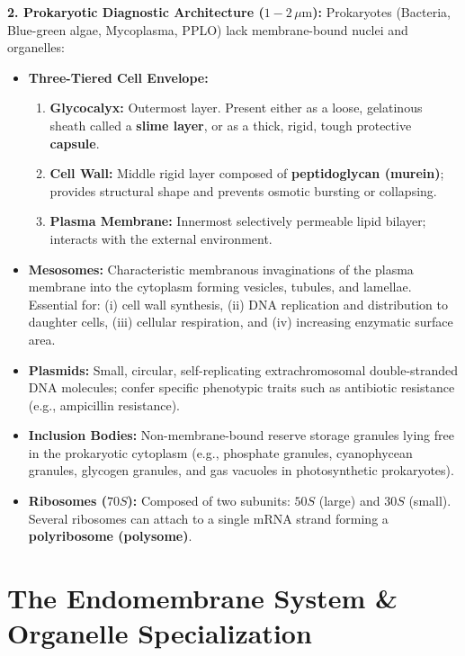 \documentclass[10pt,twoside,openright]{book}
\begin{document}
\begin{conceptbox}
\textbf{2. Prokaryotic Diagnostic Architecture ($1-2\,\mu\mathrm{m}$):}
Prokaryotes (Bacteria, Blue-green algae, Mycoplasma, PPLO) lack membrane-bound nuclei and organelles:
\begin{itemize}
  \item \textbf{Three-Tiered Cell Envelope:}
  \begin{enumerate}
    \item \textbf{Glycocalyx:} Outermost layer. Present either as a loose, gelatinous sheath called a \textbf{slime layer}, or as a thick, rigid, tough protective \textbf{capsule}.
    \item \textbf{Cell Wall:} Middle rigid layer composed of \textbf{peptidoglycan (murein)}; provides structural shape and prevents osmotic bursting or collapsing.
    \item \textbf{Plasma Membrane:} Innermost selectively permeable lipid bilayer; interacts with the external environment.
  \end{enumerate}
  \item \textbf{Mesosomes:} Characteristic membranous invaginations of the plasma membrane into the cytoplasm forming vesicles, tubules, and lamellae. Essential for: (i) cell wall synthesis, (ii) DNA replication and distribution to daughter cells, (iii) cellular respiration, and (iv) increasing enzymatic surface area.
  \item \textbf{Plasmids:} Small, circular, self-replicating extrachromosomal double-stranded DNA molecules; confer specific phenotypic traits such as antibiotic resistance (e.g., ampicillin resistance).
  \item \textbf{Inclusion Bodies:} Non-membrane-bound reserve storage granules lying free in the prokaryotic cytoplasm (e.g., phosphate granules, cyanophycean granules, glycogen granules, and gas vacuoles in photosynthetic prokaryotes).
  \item \textbf{Ribosomes ($70S$):} Composed of two subunits: $50S$ (large) and $30S$ (small). Several ribosomes can attach to a single mRNA strand forming a \textbf{polyribosome (polysome)}.
\end{itemize}
\end{conceptbox}

\section{The Endomembrane System \& Organelle Specialization}
\end{document}
